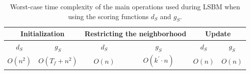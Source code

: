 \documentclass[draft,final]{vutinfth} %
\begin{document}
\begin{table}
    \centering
    \begin{tabular}{cc | cc | cc}
        \toprule
        \multicolumn{2}{c}{Initialization} & \multicolumn{2}{c}{Restricting the neighborhood} & \multicolumn{2}{c}{Update}  \\ \hline
        $d_S$ & $g_S$ & $d_S$ & $g_S$ & $d_S$ & $g_S$  \\ 
        $O(n^2)$ & $O(T_f + n^2)$ & $O(n)$ & $O(k^\prime \cdot n)$ & $O(n)$ & $O(n)$ 
    \end{tabular}
    \caption{Worst-case time complexity of the main operations used during LSBM when using the scoring functions $d_S$ and $g_S$. }
    \label{tab:runtime-analysis}
\end{table}





\end{document}
